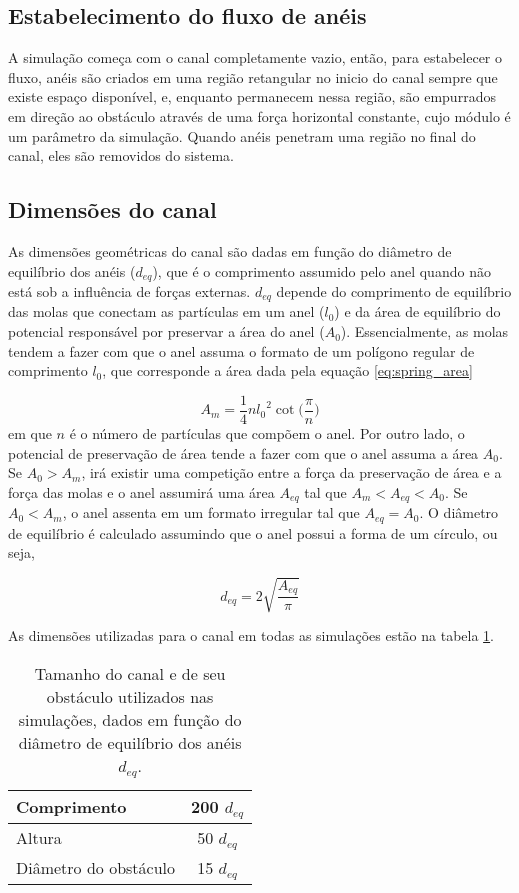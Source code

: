\documentclass{article}
\theoremstyle{definition}
\begin{document}
\subsection{Estabelecimento do fluxo de anéis}
A simulação começa com o canal completamente vazio, então, para estabelecer o fluxo, anéis são criados em uma região retangular no inicio do canal sempre que existe espaço disponível, e, enquanto permanecem nessa região, são empurrados em direção ao obstáculo através de uma força horizontal constante, cujo módulo é um parâmetro da simulação. Quando anéis penetram uma região no final do canal, eles são removidos do sistema.

\subsection{Dimensões do canal}
As dimensões geométricas do canal são dadas em função do diâmetro de equilíbrio dos anéis ($d_{eq}$), que é o comprimento assumido pelo anel quando não está sob a influência de forças externas. $d_{eq}$ depende do comprimento de equilíbrio das molas que conectam as partículas em um anel ($l_0$) e da área de equilíbrio do potencial responsável por preservar a área do anel ($A_0$). Essencialmente, as molas tendem a fazer com que o anel assuma o formato de um polígono regular de comprimento $l_0$, que corresponde a área dada pela equação \ref{eq:spring_area} 

\begin{equation}
    A_m = \frac{1}{4}n{l_0}^2\cot\bigg(\frac{\pi}{n}\bigg)
    \label{eq:spring_area}
\end{equation}
em que $n$ é o número de partículas que compõem o anel. Por outro lado, o potencial de preservação de área tende a fazer com que o anel assuma a área $A_0$. Se $A_0 > A_m$, irá existir uma competição entre a força da preservação de área e a força das molas e o anel assumirá uma área $A_{eq}$ tal que $A_m < A_{eq} < A_0$. Se $A_0 < A_m$, o anel assenta em um formato irregular tal que $A_{eq} = A_0$. O diâmetro de equilíbrio é calculado assumindo que o anel possui a forma de um círculo, ou seja,

\begin{equation}
    d_{eq} = 2\sqrt{\frac{A_{eq}}{\pi}}
    \label{eq:ring_d_eq}
\end{equation}

As dimensões utilizadas para o canal em todas as simulações estão na tabela \ref{tab:channel_dims}.

\begin{table}[h]
    \centering
    \begin{tabular}{|| l || c ||} 
     \hline
     Comprimento & 200 $d_{eq}$ \\
     \hline
     Altura & 50 $d_{eq}$ \\
     \hline
     Diâmetro do obstáculo & 15 $d_{eq}$ \\
     \hline
    \end{tabular}
    \caption{Tamanho do canal e de seu obstáculo utilizados nas simulações, dados em função do diâmetro de equilíbrio dos anéis $d_{eq}$.}
    \label{tab:channel_dims}
\end{table}
\end{document}

